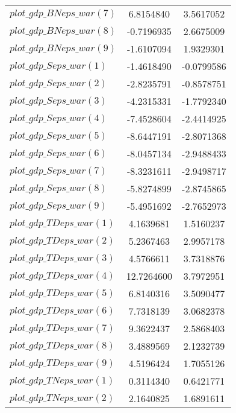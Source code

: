 \begin{center}
\begin{longtable}{lcc}
$plot\_gdp\_BN eps\_war (7)  $	 & 	      6.8154840	 & 	      3.5617052 \\ 
$plot\_gdp\_BN eps\_war (8)  $	 & 	     -0.7196935	 & 	      2.6675009 \\ 
$plot\_gdp\_BN eps\_war (9)  $	 & 	     -1.6107094	 & 	      1.9329301 \\ 
$plot\_gdp\_S eps\_war (1)   $	 & 	     -1.4618490	 & 	     -0.0799586 \\ 
$plot\_gdp\_S eps\_war (2)   $	 & 	     -2.8235791	 & 	     -0.8578751 \\ 
$plot\_gdp\_S eps\_war (3)   $	 & 	     -4.2315331	 & 	     -1.7792340 \\ 
$plot\_gdp\_S eps\_war (4)   $	 & 	     -7.4528604	 & 	     -2.4414925 \\ 
$plot\_gdp\_S eps\_war (5)   $	 & 	     -8.6447191	 & 	     -2.8071368 \\ 
$plot\_gdp\_S eps\_war (6)   $	 & 	     -8.0457134	 & 	     -2.9488433 \\ 
$plot\_gdp\_S eps\_war (7)   $	 & 	     -8.3231611	 & 	     -2.9498717 \\ 
$plot\_gdp\_S eps\_war (8)   $	 & 	     -5.8274899	 & 	     -2.8745865 \\ 
$plot\_gdp\_S eps\_war (9)   $	 & 	     -5.4951692	 & 	     -2.7652973 \\ 
$plot\_gdp\_TD eps\_war (1)  $	 & 	      4.1639681	 & 	      1.5160237 \\ 
$plot\_gdp\_TD eps\_war (2)  $	 & 	      5.2367463	 & 	      2.9957178 \\ 
$plot\_gdp\_TD eps\_war (3)  $	 & 	      4.5766611	 & 	      3.7318876 \\ 
$plot\_gdp\_TD eps\_war (4)  $	 & 	     12.7264600	 & 	      3.7972951 \\ 
$plot\_gdp\_TD eps\_war (5)  $	 & 	      6.8140316	 & 	      3.5090477 \\ 
$plot\_gdp\_TD eps\_war (6)  $	 & 	      7.7318139	 & 	      3.0682378 \\ 
$plot\_gdp\_TD eps\_war (7)  $	 & 	      9.3622437	 & 	      2.5868403 \\ 
$plot\_gdp\_TD eps\_war (8)  $	 & 	      3.4889569	 & 	      2.1232739 \\ 
$plot\_gdp\_TD eps\_war (9)  $	 & 	      4.5196424	 & 	      1.7055126 \\ 
$plot\_gdp\_TN eps\_war (1)  $	 & 	      0.3114340	 & 	      0.6421771 \\ 
$plot\_gdp\_TN eps\_war (2)  $	 & 	      2.1640825	 & 	      1.6891611 \\ 

\end{longtable}
\end{center}
